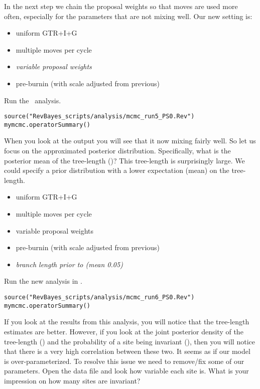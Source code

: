 In the next step we chain the proposal weights so that moves are used more often, especially for the parameters that are not mixing well.
Our new setting is:
\begin{itemize}
\item{uniform GTR+I+G}
\item{multiple moves per cycle}
\item{\it variable proposal weights}
\item{pre-burnin (with scale adjusted from previous)}
\end{itemize}
Run the \RevBayes~analysis.
{\tt \begin{snugshade*}
\begin{lstlisting}
source("RevBayes_scripts/analysis/mcmc_run5_PS0.Rev")
mymcmc.operatorSummary()
\end{lstlisting}
\end{snugshade*}}
When you look at the output you will see that it now mixing fairly well.
So let us focus on the approximated posterior distribution.
Specifically, what is the posterior mean of the tree-length ()?
This tree-length is surprisingly large. 
We could specify a prior distribution with a lower expectation (mean) on the tree-length.
\begin{itemize}
\item{uniform GTR+I+G}
\item{multiple moves per cycle}
\item{variable proposal weights}
\item{pre-burnin (with scale adjusted from previous)}
\item{\it branch length prior to  (mean 0.05)}
\end{itemize}
Run the new analysis in \RevBayes.
{\tt \begin{snugshade*}
\begin{lstlisting}
source("RevBayes_scripts/analysis/mcmc_run6_PS0.Rev")
mymcmc.operatorSummary()
\end{lstlisting}
\end{snugshade*}}
If you look at the results from this analysis, you will notice that the tree-length estimates are better.
However, if you look at the joint posterior density of the tree-length () and the probability of a site being invariant (), then you will notice that there is a very high correlation between these two.
It seems as if our model is over-parameterized.
To resolve this issue we need to remove/fix some of our parameters.
Open the data file and look how variable each site is. What is your impression on how many sites are invariant?

